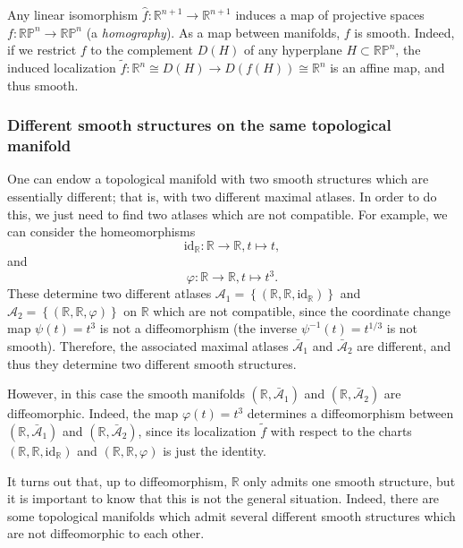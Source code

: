 \documentclass[11pt,a4paper]{book}
\theoremstyle{remark} \newtheorem{rmk}[thm]{Remark}
\theoremstyle{definition} \newtheorem{defn}[thm]{Definition}
\theoremstyle{definition} \newtheorem{ex}[thm]{Example}
\theoremstyle{definition} \newtheorem{ej}[thm]{Exercise}
\begin{document}
Any linear isomorphism $\hat{f}:\mathbb{R}^{n+1}\rightarrow \mathbb{R}^{n+1}$ induces a map of projective spaces $f:\mathbb{RP}^n\rightarrow \mathbb{RP}^n$ (a \emph{homography}). As a map between manifolds, $f$ is smooth. Indeed, if we restrict $f$ to the complement $D(H)$ of any hyperplane $H\subset \mathbb{RP}^n$, the induced localization $\tilde{f}:\mathbb{R}^n \cong D(H)\rightarrow D(f(H))\cong \mathbb{R}^n$ is an affine map, and thus smooth.

\subsubsection{Different smooth structures on the same topological manifold} One can endow a topological manifold with two smooth structures which are essentially different; that is, with two different maximal atlases. In order to do this, we just need to find two atlases which are not compatible. For example, we can consider the homeomorphisms
\begin{equation*}
\mathrm{id}_{\mathbb{R}}: \mathbb{R} \rightarrow \mathbb{R}, t \mapsto t,
\end{equation*}
and
\begin{equation*}
\varphi: \mathbb{R} \rightarrow \mathbb{R}, t \mapsto t^3.
\end{equation*}
These determine two different atlases $\mathcal{A}_1=\left\{ (\mathbb{R},\mathbb{R},\mathrm{id}_{\mathbb{R}}) \right\}$ and $\mathcal{A}_2=\left\{ (\mathbb{R},\mathbb{R},\varphi) \right\}$ on $\mathbb{R}$ which are not compatible, since the coordinate change map $\psi(t)=t^3$ is not a diffeomorphism (the inverse $\psi^{-1}(t)=t^{1/3}$ is not smooth). Therefore, the associated maximal atlases $\bar{\mathcal{A}}_1$ and $\bar{\mathcal{A}}_2$ are different, and thus they determine two different smooth structures.

However, in this case the smooth manifolds $(\mathbb{R},\bar{\mathcal{A}}_1)$ and $(\mathbb{R},\bar{\mathcal{A}}_2)$ are diffeomorphic. Indeed, the map $\varphi(t)=t^3$ determines a diffeomorphism between $(\mathbb{R},\bar{\mathcal{A}}_1)$ and $(\mathbb{R},\bar{\mathcal{A}}_2)$, since its localization $\tilde{f}$ with respect to the charts $(\mathbb{R},\mathbb{R},\mathrm{id}_{\mathbb{R}})$ and $(\mathbb{R},\mathbb{R},\varphi)$ is just the identity.

It turns out that, up to diffeomorphism, $\mathbb{R}$ only admits one smooth structure, but it is important to know that this is not the general situation. Indeed, there are some topological manifolds which admit several different smooth structures which are not diffeomorphic to each other.
\end{document}
